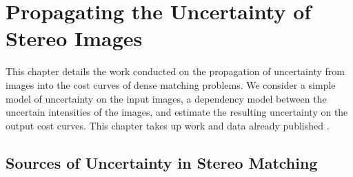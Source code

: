 \chapter{Propagating the Uncertainty of Stereo Images}\label{chap:propagating}
This chapter details the work conducted on the propagation of uncertainty from images into the cost curves of dense matching problems. We consider a simple model of uncertainty on the input images, a dependency model between the uncertain intensities of the images, and estimate the resulting uncertainty on the output cost curves. This chapter takes up work and data already published \cite{malinowski_copulas_2022, malinowski_uncertainty_2023, malinowski_robust_2024}.

\section{Sources of Uncertainty in Stereo Matching}\label{sec:sources_of_uncertainty}

